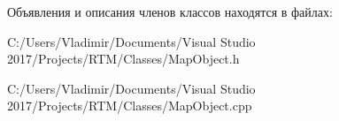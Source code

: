 Объявления и описания членов классов находятся в файлах\+:\begin{DoxyCompactItemize}
\item 
C\+:/\+Users/\+Vladimir/\+Documents/\+Visual Studio 2017/\+Projects/\+R\+T\+M/\+Classes/Map\+Object.\+h\item 
C\+:/\+Users/\+Vladimir/\+Documents/\+Visual Studio 2017/\+Projects/\+R\+T\+M/\+Classes/Map\+Object.\+cpp\end{DoxyCompactItemize}
